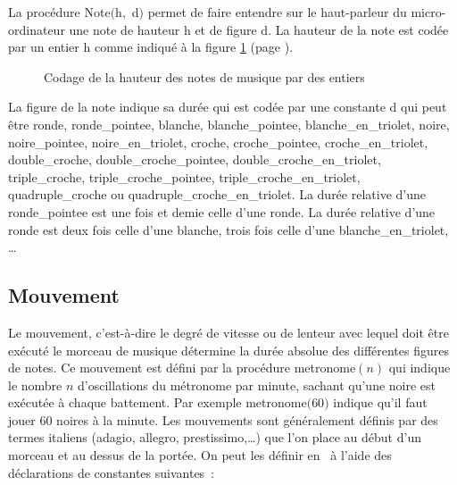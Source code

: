 La procédure {\idt Note$($h$,$ d$)$} permet
de faire entendre sur le haut-parleur du micro-ordinateur une note de hauteur {\idt h} et de
figure {\idt d}. La hauteur de la note est codée par un entier {\idt h} comme indiqué à la figure
\ref{fig:codenotes} (page \pageref{fig:codenotes}).
\begin{figure}[htbp]
 
 \caption{Codage de la hauteur des notes de musique par des entiers}\label{fig:codenotes}
\end{figure}
La figure de la note indique sa durée qui est codée par une constante {\idt d} qui peut être {\idt ronde}, 
{\idt ronde\_pointee}, 
{\idt blanche}, 
{\idt blanche\_pointee}, 
{\idt blanche\_en\_triolet},  
{\idt noire}, 
{\idt noi\-re\_poin\-tee},       
{\idt noi\-re\_\-en\_\-tri\-o\-let},      
 {\idt croche}, 
 {\idt croche\_pointee}, 
{\idt cro\-che\_\-en\_\-trio\-let},  
{\idt double\_croche},       
{\idt dou\-ble\_\-cro\-che\_\-poin\-tee}, 
{\idt double\_croche\_en\_trio\-let},    
{\idt tri\-ple\_\-cro\-che},   
{\idt tri\-ple\_\-cro\-che\_\-poin\-tee}, 
{\idt tri\-ple\_\-cro\-che\_\-en\_\-tri\-o\-let},   {\idt qua\-dru\-ple\_\-cro\-che}           ou 
{\idt quadruple\_croche\_en\_triolet}. La durée relative d'une {\idt ron\-de\_\-poin\-tee} est 
une fois et demie celle d'une
 {\idt ronde}. La durée relative d'une {\idt ronde} est  deux fois celle d'une
 {\idt blanche}, trois fois celle d'une {\idt blan\-che\_\-en\_\-trio\-let}, \ldots   
 
 \subsection{Mouvement}
 
 Le mouvement, 
 c'est-à-dire le degré de vitesse ou de lenteur avec lequel doit être exécuté le morceau de 
 musique détermine la durée absolue des différentes figures de notes. Ce mouvement est défini
 par la procédure {\idt metronome$(n)$} qui indique le nombre $n$ d'oscillations du
 métronome par minute, sachant qu'une noire est exécutée à chaque battement.  Par exemple
 {\idt metronome$($60$)$} indique qu'il faut jouer 60 noires à la minute. Les mouvements
 sont gé\-né\-ra\-le\-ment définis par des termes italiens (adagio, allegro, prestissimo,\ldots) que
 l'on place au début d'un morceau et au dessus de la portée. On peut les définir
 en \pascal\ à l'aide des déclarations de constantes suivantes~:

